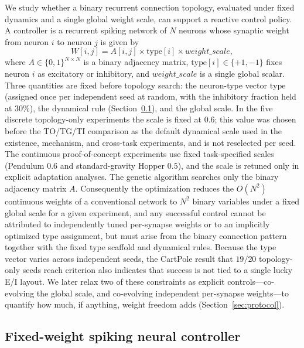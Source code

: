 \documentclass[10pt]{article}
\begin{document}
We study whether a binary recurrent connection topology, evaluated under fixed
dynamics and a single global weight scale, can support a reactive control
policy. A controller is a recurrent spiking network of $N$ neurons whose synaptic
weight from neuron $i$ to neuron $j$ is given by
\begin{equation}
W[i,j] = A[i,j] \times \text{type}[i] \times \mathit{weight\_scale},
\label{eq:weight}
\end{equation}
where $A \in \{0,1\}^{N \times N}$ is a binary adjacency matrix,
$\text{type}[i] \in \{+1,-1\}$ fixes neuron $i$ as excitatory or inhibitory, and
$\mathit{weight\_scale}$ is a single global scalar. Three quantities are fixed
before topology search: the neuron-type vector $\text{type}$ (assigned once per
independent seed at random, with the inhibitory fraction held at $30\%$), the
dynamical rule (Section~\ref{sec:controller}), and the global scale. In the five
discrete topology-only experiments the scale is fixed at $0.6$; this value was
chosen before the TO/TG/TI comparison as the default dynamical scale used in the
existence, mechanism, and cross-task experiments, and is not reselected per
seed. The continuous proof-of-concept experiments use fixed task-specified
scales (Pendulum $0.6$ and standard-gravity Hopper $0.5$), and the scale is
retuned only in explicit adaptation analyses. The genetic algorithm searches
only the binary adjacency matrix $A$. Consequently the optimization reduces the
$O(N^2)$ continuous weights of a conventional network to $N^2$ binary variables
under a fixed global scale for a given experiment, and any successful control
cannot be attributed to independently tuned per-synapse weights or to an
implicitly optimized type assignment, but must arise from the binary connection
pattern together with the fixed type scaffold and dynamical rules. Because the
type vector varies across independent seeds, the CartPole result that $19/20$
topology-only seeds reach criterion also indicates that success is not tied to a
single lucky E/I layout. We later relax two of these constraints as explicit
controls---co-evolving the global scale, and co-evolving independent per-synapse
weights---to quantify how much, if anything, weight freedom adds
(Section~\ref{sec:protocol}).

\subsection{Fixed-weight spiking neural controller}
\label{sec:controller}
\end{document}
